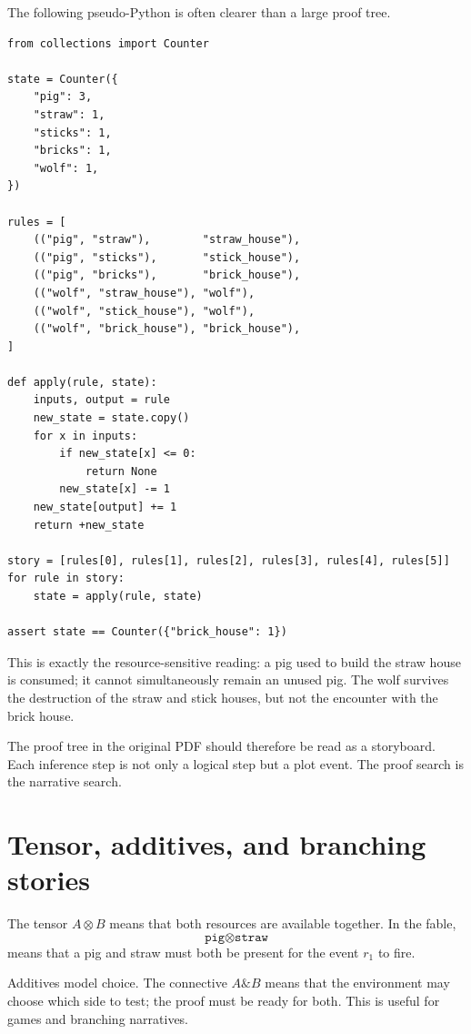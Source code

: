 \begin{example}
The following pseudo-Python is often clearer than a large proof tree.
\begin{verbatim}
from collections import Counter

state = Counter({
    "pig": 3,
    "straw": 1,
    "sticks": 1,
    "bricks": 1,
    "wolf": 1,
})

rules = [
    (("pig", "straw"),        "straw_house"),
    (("pig", "sticks"),       "stick_house"),
    (("pig", "bricks"),       "brick_house"),
    (("wolf", "straw_house"), "wolf"),
    (("wolf", "stick_house"), "wolf"),
    (("wolf", "brick_house"), "brick_house"),
]

def apply(rule, state):
    inputs, output = rule
    new_state = state.copy()
    for x in inputs:
        if new_state[x] <= 0:
            return None
        new_state[x] -= 1
    new_state[output] += 1
    return +new_state

story = [rules[0], rules[1], rules[2], rules[3], rules[4], rules[5]]
for rule in story:
    state = apply(rule, state)

assert state == Counter({"brick_house": 1})
\end{verbatim}
This is exactly the resource-sensitive reading: a pig used to build the straw house is consumed; it cannot simultaneously remain an unused pig.  The wolf survives the destruction of the straw and stick houses, but not the encounter with the brick house.
\end{example}

The proof tree in the original PDF should therefore be read as a storyboard.  Each inference step is not only a logical step but a plot event.  The proof search is the narrative search.

\section{Tensor, additives, and branching stories}

The tensor \(A\otimes B\) means that both resources are available together.  In the fable,
\[
  \texttt{pig}\otimes\texttt{straw}
\]
means that a pig and straw must both be present for the event \(r_1\) to fire.

Additives model choice.  The connective \(A\& B\) means that the environment may choose which side to test; the proof must be ready for both.  This is useful for games and branching narratives.

